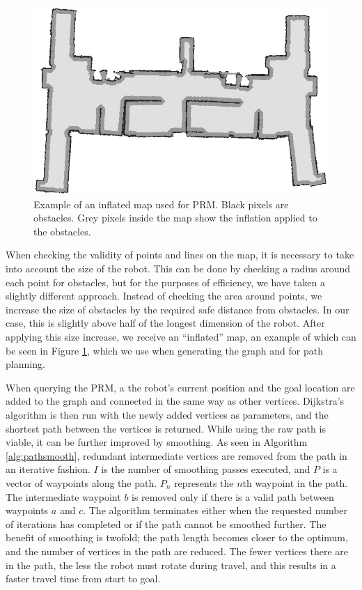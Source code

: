 \documentclass[conference]{IEEEtran}
\begin{document}
\begin{figure}
  \centering
  \includegraphics[width=\columnwidth]{inflated}
  \caption{Example of an inflated map used for PRM. Black pixels are obstacles. Grey pixels inside the map show the inflation applied to the obstacles.}
  \label{fig:inflatedmap}
\end{figure}
When checking the validity of points and lines on the map, it is necessary to take into account the size of the robot. This can be done by checking a radius around each point for obstacles, but for the purposes of efficiency, we have taken a slightly different approach. Instead of checking the area around points, we increase the size of obstacles by the required safe distance from obstacles. In our case, this is slightly above half of the longest dimension of the robot. After applying this size increase, we receive an ``inflated'' map, an example of which can be seen in Figure \ref{fig:inflatedmap}, which we use when generating the graph and for path planning.

When querying the PRM, a the robot's current position and the goal location are added to the graph and connected in the same way as other vertices. Dijkstra's algorithm is then run with the newly added vertices as parameters, and the shortest path between the vertices is returned. While using the raw path is viable, it can be further improved by smoothing. As seen in Algorithm \ref{alg:pathsmooth}, redundant intermediate vertices are removed from the path in an iterative fashion. $I$ is the number of smoothing passes executed, and $P$ is a vector of waypoints along the path. $P_n$ represents the $n$th waypoint in the path. The intermediate waypoint $b$ is removed only if there is a valid path between waypoints $a$ and $c$. The algorithm terminates either when the requested number of iterations has completed or if the path cannot be smoothed further. The benefit of smoothing is twofold; the path length becomes closer to the optimum, and the number of vertices in the path are reduced. The fewer vertices there are in the path, the less the robot must rotate during travel, and this results in a faster travel time from start to goal.
\end{document}

